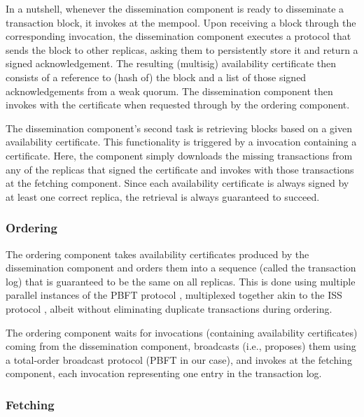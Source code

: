 \documentclass{article}
\begin{document}
In a nutshell, whenever the dissemination component is ready to disseminate a transaction block,
it invokes  at the mempool.
Upon receiving a block through the corresponding  invocation,
the dissemination component executes a protocol that sends the block to other replicas,
asking them to persistently store it and return a signed acknowledgement.
The resulting (multisig) availability certificate then consists of a reference to (hash of) the block
and a list of those signed acknowledgements from a weak quorum.
The dissemination component then invokes  with the certificate
when requested through  by the ordering component.

The dissemination component’s second task is retrieving blocks based on a given availability certificate.
This functionality is triggered by a  invocation containing a certificate.
Here, the component simply downloads the missing transactions from any of the replicas
that signed the certificate and invokes  with those transactions at the fetching component.
Since each availability certificate is always signed by at least one correct replica, the retrieval is always guaranteed to succeed.

\subsubsection{Ordering}

The ordering component takes availability certificates produced by the dissemination component
and orders them into a sequence (called the transaction log) that is guaranteed to be the same on all replicas.
This is done using multiple parallel instances of the PBFT protocol \cite{pbft},
multiplexed together akin to the ISS protocol \cite{iss}, albeit without eliminating duplicate transactions during ordering. 

The ordering component waits for  invocations
(containing availability certificates) coming from the dissemination component,
broadcasts (i.e., proposes) them using a total-order broadcast protocol (PBFT in our case),
and invokes  at the fetching component, each invocation representing one entry in the transaction log.

\subsubsection{Fetching}
\label{sec:fetching}
\end{document}
